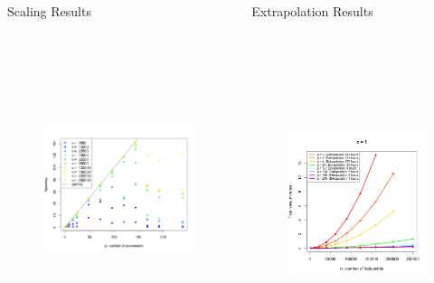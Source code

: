 \documentclass[serif,mathserif,final]{beamer}
\begin{document}
\begin{frame}{}
\begin{columns}[t]
\begin{column}{0.32\linewidth}
       \begin{block}{Scaling Results}
        \begin{figure}[htbp]
            \centering
            \includegraphics[height=9cm]{speedup.png} %
            \label{fig:plot}
         \end{figure}
      \end{block}

    \end{column}%

    \begin{column}{0.32\linewidth}

      \begin{block}{Extrapolation Results}
        \begin{figure}[htbp]
            \centering
            \includegraphics[height=10cm]{timing.png} %
            \label{fig:plot}
         \end{figure}
      \end{block}


\end{column}
\end{columns}
\end{frame}
\end{document}
